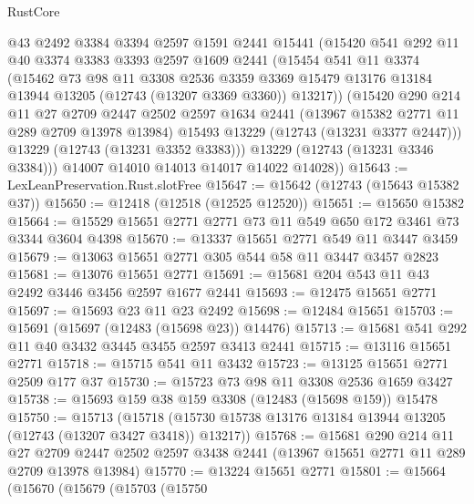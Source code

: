 \begin{lexlean}{RustCore}
\begin{coremodule}
          @43
          @2492
          @3384
          @3394
          @2597
          @1591
          @2441
          @15441
          (@15420
            @541
            @292
            @11
            @40
            @3374
            @3383
            @3393
            @2597
            @1609
            @2441
            (@15454
              @541
              @11
              @3374
              (@15462
                @73
                @98
                @11
                @3308
                @2536
                @3359
                @3369
                @15479
                @13176
                @13184
                @13944
                @13205
                (@12743 (@13207 @3369 @3360))
                @13217))
            (@15420
              @290
              @214
              @11
              @27
              @2709
              @2447
              @2502
              @2597
              @1634
              @2441
              (@13967 @15382 @2771 @11 @289 @2709 @13978 @13984)
              @15493
              @13229
              (@12743 (@13231 @3377 @2447)))
            @13229
            (@12743 (@13231 @3352 @3383)))
          @13229
          (@12743 (@13231 @3346 @3384)))
        @14007
        @14010
        @14013
        @14017
        @14022
        @14028))
@15643 := LexLeanPreservation.Rust.slotFree
@15647 := @15642 (@12743 (@15643 @15382 @37))
@15650 := @12418 (@12518 (@12525 @12520))
@15651 := @15650 @15382
@15664 := @15529 @15651 @2771 @2771 @73 @11 @549 @650 @172 @3461 @73 @3344 @3604 @4398
@15670 := @13337 @15651 @2771 @549 @11 @3447 @3459
@15679 := @13063 @15651 @2771 @305 @544 @58 @11 @3447 @3457 @2823
@15681 := @13076 @15651 @2771
@15691 := @15681 @204 @543 @11 @43 @2492 @3446 @3456 @2597 @1677 @2441
@15693 := @12475 @15651 @2771
@15697 := @15693 @23 @11 @23 @2492
@15698 := @12484 @15651
@15703 := @15691 (@15697 (@12483 (@15698 @23)) @14476)
@15713 := @15681 @541 @292 @11 @40 @3432 @3445 @3455 @2597 @3413 @2441
@15715 := @13116 @15651 @2771
@15718 := @15715 @541 @11 @3432
@15723 := @13125 @15651 @2771 @2509 @177 @37
@15730 := @15723 @73 @98 @11 @3308 @2536 @1659 @3427
@15738 := @15693 @159 @38 @159 @3308 (@12483 (@15698 @159)) @15478
@15750 := @15713
    (@15718 (@15730 @15738 @13176 @13184 @13944 @13205 (@12743 (@13207 @3427 @3418)) @13217))
@15768 := @15681
    @290
    @214
    @11
    @27
    @2709
    @2447
    @2502
    @2597
    @3438
    @2441
    (@13967 @15651 @2771 @11 @289 @2709 @13978 @13984)
@15770 := @13224 @15651 @2771
@15801 := @15664
    (@15670
      (@15679
        (@15703
          (@15750

\end{coremodule}
\end{lexlean}
